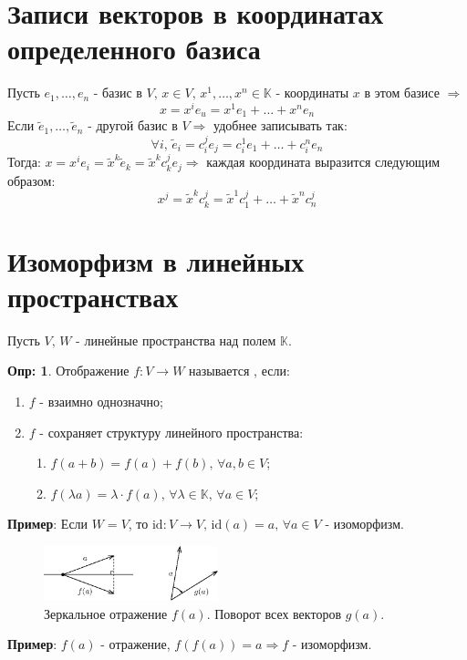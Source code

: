 \documentclass[12pt]{article}
\newcommand{\id}{\mathrm{id}}
\theoremstyle{definition}
\newtheorem{defn}{Опр:}
\begin{document}
\section*{Записи векторов в координатах определенного базиса}
Пусть $e_1,\dotsc, e_n$ - базис в $V, \, x \in V, \, x^1, \dotsc, x^n \in \mathbb{K}$ - координаты $x$ в этом базисе $\Rightarrow$ 
$$x = x^ie_u = x^1e_1 + \dotsc + x^ne_n$$
Если $\widetilde{e}_1, \dotsc, \widetilde{e}_n$ - другой базис в $V \Rightarrow$ удобнее записывать так: 
$$
	\forall i, \, \widetilde{e}_i = c_i^j e_j = c_i^1 e_1 + \dotsc + c_i^n e_n
$$
Тогда: $x = x^i e_i = \widetilde{x}^k \widetilde{e}_k = \widetilde{x}^k c_k^j e_j \Rightarrow$ каждая координата выразится следующим образом: 
$$
	x^j = \widetilde{x}^k c_k^j = \widetilde{x}^1 c_1^j + \dotsc + \widetilde{x}^n c_n^j
$$

\section*{Изоморфизм в линейных пространствах}
Пусть $V, \, W$ - линейные пространства над полем $\mathbb{K}$.
\begin{defn}
	Отображение $f \colon V \to W$ называется , если:
	\begin{enumerate}[label ={(\arabic*)}]
		\item $f$ - взаимно однозначно;
		\item $f$ - сохраняет структуру линейного пространства: 
		\begin{enumerate}[label ={\arabic*)}]
			\item $f(a + b) = f(a) + f(b), \, \forall a,b \in V$;
			\item $f(\lambda a) = \lambda{\cdot}f(a),\, \forall \lambda \in \mathbb{K}, \, \forall a\in V$;
		\end{enumerate}
	\end{enumerate}
\end{defn}

\textbf{Пример}: Если $W = V$, то $\id \colon V \to V, \, \id{(a)} = a, \, \forall a \in V$ - изоморфизм.
\begin{figure}[H]
	\centering
	\includegraphics[width=0.45\textwidth]{3_1.eps}
	\caption{Зеркальное отражение $f(a)$. Поворот всех векторов $g(a)$.}
	\label{3_1}
\end{figure}
\textbf{Пример}: $f(a)$ - отражение, $f(f(a)) = a \Rightarrow f$ - изоморфизм.
\end{document}
